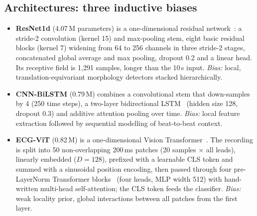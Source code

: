 \subsection{Architectures: three inductive biases}
\begin{itemize}
  \item \textbf{ResNet1d} (4.07\,M parameters) is a one-dimensional residual network~\cite{he2016resnet}: a stride-2 convolution (kernel 15) and max-pooling stem, eight basic residual blocks (kernel 7) widening from 64 to 256 channels in three stride-2 stages, concatenated global average and max pooling, dropout 0.2 and a linear head. Its receptive field is 1,291 samples, longer than the 10\,s input. \emph{Bias:} local, translation-equivariant morphology detectors stacked hierarchically.
  \item \textbf{CNN-BiLSTM} (0.79\,M) combines a convolutional stem that down-samples by 4 (250 time steps), a two-layer bidirectional LSTM~\cite{hochreiter1997lstm} (hidden size 128, dropout 0.3) and additive attention pooling over time. \emph{Bias:} local feature extraction followed by sequential modelling of beat-to-beat context.
  \item \textbf{ECG-ViT} (0.82\,M) is a one-dimensional Vision Transformer~\cite{dosovitskiy2021vit}. The recording is split into 50 non-overlapping 200\,ms patches (20 samples $\times$ all leads), linearly embedded ($D=128$), prefixed with a learnable CLS token and summed with a sinusoidal position encoding, then passed through four pre-LayerNorm Transformer blocks~\cite{vaswani2017attention} (four heads, MLP width 512) with hand-written multi-head self-attention; the CLS token feeds the classifier. \emph{Bias:} weak locality prior, global interactions between all patches from the first layer.
\end{itemize}

